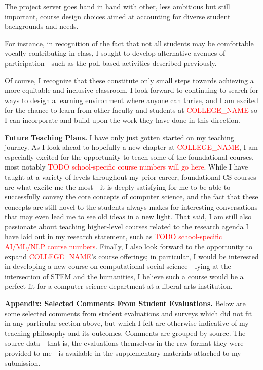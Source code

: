 \documentclass[11pt,letterpaper]{article}
\renewcommand{\section}[1]{\vspace{0.25\baselineskip}\noindent\textbf{#1.}}
\newcommand{\schoolname}{\textcolor{red}{COLLEGE\_NAME}\xspace} %
\newif\iflongdei
\newif\ifappendix
\begin{document}
The project server goes hand in hand with other, less ambitious but still important, course design choices aimed at accounting for diverse student backgrounds and needs.
\iflongdei
I discuss these in more detail in my statement on diversity, equity, and inclusion.
\else
For instance, in recognition of the fact that not all students may be comfortable vocally contributing in class, I sought to develop alternative avenues of participation---such as the poll-based activities described previously.
\fi
Of course, I recognize that these constitute only small steps towards achieving a more equitable and inclusive classroom.
I look forward to continuing to search for ways to design a learning environment where anyone can thrive, and I am excited for the chance to learn from other faculty and students at \schoolname so I can incorporate and build upon the work they have done in this direction.

\section{Future Teaching Plans}
I have only just gotten started on my teaching journey.
As I look ahead to hopefully a new chapter at \schoolname, I am especially excited for the opportunity to teach some of the foundational courses, most notably \textcolor{red}{TODO school-specific course numbers will go here}.
While I have taught at a variety of levels throughout my prior career, foundational CS courses are what excite me the most---it is deeply satisfying for me to be able to successfully convey the core concepts of computer science, and the fact that these concepts are still novel to the students always makes for interesting conversations that may even lead me to see old ideas in a new light.
That said, I am still also passionate about teaching higher-level courses related to the research agenda I have laid out in my research statement, such as \textcolor{red}{TODO school-specific AI/ML/NLP course numbers}.
Finally, I also look forward to the opportunity to expand \schoolname's course offerings; in particular, I would be interested in developing a new course on computational social science---lying at the intersection of STEM and the humanities, I believe such a course would be a perfect fit for a computer science department at a liberal arts institution.

\ifappendix
\vspace{\baselineskip}
\section{Appendix: Selected Comments From Student Evaluations}
Below are some selected comments from student evaluations and surveys which did not fit in any particular section above, but which I felt are otherwise indicative of my teaching philosophy and its outcomes.
Comments are grouped by source.
The source data---that is, the evaluations themselves in the raw format they were provided to me---is available in the supplementary materials attached to my submission.
\end{document}
